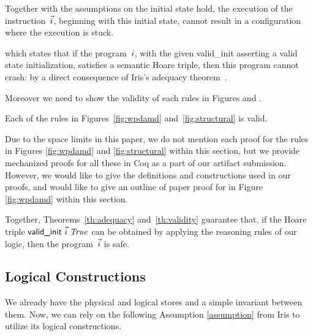 \begin{theorem}
  \label{th:adequacy}
 Together with the assumptions on the initial state hold,
 the execution of the instruction~$\vec{i}$, beginning with this initial state, cannot result in a configuration where the execution is stuck.
\end{theorem}
which states that if the program~$i$, with the given \textsf{valid\_init} asserting a valid state initialization, satisfies a semantic Hoare
triple, then this program cannot crash: by a direct consequence of Iris's adequacy theorem~\cite[\S6.4]{iris}.

Moreover we need to show the validity of each rules in Figures  and .
\begin{theorem}
\label{th:validity}
  Each of the rules in Figures~\ref{fig:wpdamd}
  and~\ref{fig:structural} is valid.
\end{theorem}
Due to the space limits in this paper, we do not mention each proof for the rules in Figures \ref{fig:wpdamd} and \ref{fig:structural} within this section, but we provide mechanized proofs for all these in Coq as a part of our artifact submission.
However, we would like to give the definitions and constructions used in our proofs, and would like to give an outline of paper proof for  in Figure \ref{fig:wpdamd} within this section.

Together, Theorems~\ref{th:adequacy} and~\ref{th:validity} guarantee that, if
the Hoare triple $\textsf{valid\_init }\vec{i}\;\mathit{True}$ can be obtained by applying
the reasoning rules of our logic, then the program~$\vec{i}$ is safe.

\subsection{Logical Constructions}
\label{sec:invariant}

We already have the physical and logical stores and a simple invariant between them. Now, we can rely on the following Assumption \ref{assumption} from Iris to utilize its logical constructions.
\newcommand{\genheapinterp}[1]{\mathit{Heap}\;#1}
\newcommand{\genmemheapinterp}[1]{\mathit{MemHeap}\;#1}
\newcommand{\pred}[1]{\ownGhost\gammaPred{\authfull{(\mapone\predstore)}}}
\newcommand{\mapone}[1]{1.#1}
\newcommand{\mapsfromexact}[3]{
  \ownGhost\gammaPred{\authfrag{\singletonMap{#1}{(#2, #3)}}}
}
\newcommand{\sh}{L'}
\newcommand{\mapsfromdef}[3]{
  \exists\sh.\;
  \mapsfromexact{#1}{#2}{\sh} \star \pure{\sh \subseteq #3}
}

